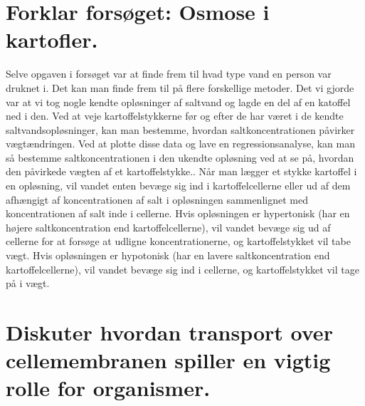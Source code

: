     \section*{Forklar forsøget: Osmose i kartofler.}
        Selve opgaven i forsøget var at finde frem til hvad type vand en person var druknet i. Det kan man finde frem til på flere forskellige metoder. Det vi gjorde var at vi tog nogle kendte opløsninger af saltvand og lagde en del af en katoffel ned i den. Ved at veje kartoffelstykkerne før og efter de har været i de kendte saltvandsopløsninger, kan man bestemme, hvordan saltkoncentrationen påvirker vægtændringen. Ved at plotte disse data og lave en regressionsanalyse, kan man så bestemme saltkoncentrationen i den ukendte opløsning ved at se på, hvordan den påvirkede vægten af et kartoffelstykke.. Når man lægger et stykke kartoffel i en opløsning, vil vandet enten bevæge sig ind i kartoffelcellerne eller ud af dem afhængigt af koncentrationen af salt i opløsningen sammenlignet med koncentrationen af salt inde i cellerne. Hvis opløsningen er hypertonisk (har en højere saltkoncentration end kartoffelcellerne), vil vandet bevæge sig ud af cellerne for at forsøge at udligne koncentrationerne, og kartoffelstykket vil tabe vægt. Hvis opløsningen er hypotonisk (har en lavere saltkoncentration end kartoffelcellerne), vil vandet bevæge sig ind i cellerne, og kartoffelstykket vil tage på i vægt.
    \section*{Diskuter hvordan transport over cellemembranen spiller en vigtig rolle for organismer.} %

